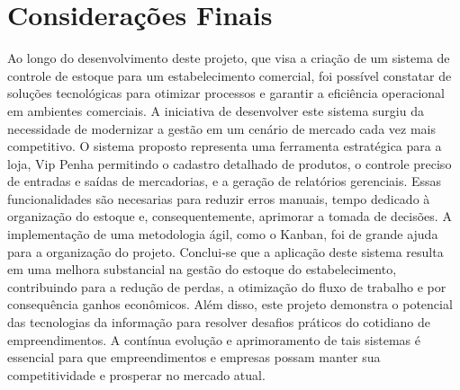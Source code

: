 \documentclass[
	12pt,				%
	openany,			%
	twoside,			%
	a4paper,			%
	english,			%
	brazil				%
	]{abntex2}
\begin{document}
\chapter{Considerações Finais}
Ao longo do desenvolvimento deste projeto, que visa a criação de um sistema de controle de estoque para um estabelecimento comercial, foi possível constatar de soluções tecnológicas para otimizar processos e garantir a eficiência operacional em ambientes comerciais. A iniciativa de desenvolver este sistema surgiu da necessidade de modernizar a gestão  em um cenário de mercado cada vez mais competitivo.
O sistema proposto representa uma ferramenta estratégica para a loja, Vip Penha permitindo o cadastro detalhado de produtos, o controle preciso de entradas e saídas de mercadorias, e a geração de relatórios gerenciais. Essas funcionalidades são necesarias para reduzir erros manuais, tempo dedicado à organização do estoque e, consequentemente, aprimorar a tomada de decisões. A implementação de uma metodologia ágil, como o Kanban, foi de grande ajuda para a organização do projeto.
Conclui-se que a aplicação deste sistema resulta em uma melhora substancial na gestão do estoque do estabelecimento, contribuindo para a redução de perdas, a otimização do fluxo de trabalho e por consequência ganhos econômicos. Além disso, este projeto demonstra o potencial das tecnologias da informação para resolver desafios práticos do cotidiano de empreendimentos. A contínua evolução e aprimoramento de tais sistemas é essencial para que empreendimentos e empresas   possam manter sua competitividade e prosperar no mercado atual.

\end{document}
